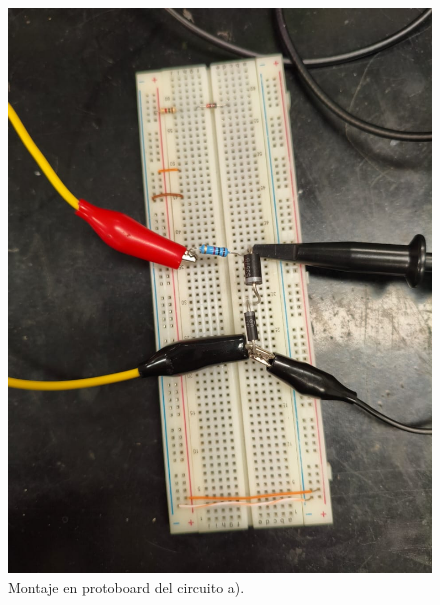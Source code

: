 \documentclass[chaptersright]{informeutn}
\begin{document}
\begin{figure}[H]
    \centering
    \begin{minipage}{0.45\textwidth}
    \centering
    \includegraphics[width=\textwidth]{pictures/circuito_A.jpeg}
    \caption{Montaje en protoboard del circuito a).}
\end{minipage}
\hspace{0.05\textwidth}
    \begin{minipage}{0.4\textwidth}
    \centering

\end{minipage}
\end{figure}
\end{document}

